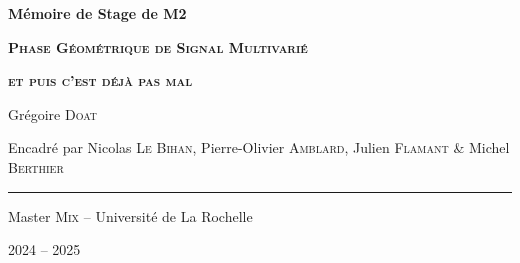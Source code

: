





	
	


\begin{titlepage}
	
	\centering
	\vspace{1.5cm}
	{\huge\textbf{Mémoire de Stage de M2}}\par
	
	\vspace{2cm}
	{\huge\textbf{\textsc{Phase Géométrique de Signal Multivarié}}}\par 
	\vspace{0.5cm}
	
	{\huge\textbf{\textsc{et puis c'est déjà pas mal}}}\par
	\vspace{2.0cm}
	
	{\large Grégoire \textsc{Doat}}\par
	\vspace{0.5cm}
	\vfill
	
	{\large Encadré par Nicolas \textsc{Le Bihan}, Pierre-Olivier \textsc{Amblard}, Julien \textsc{Flamant} \& Michel \textsc{Berthier}}\par
	\vspace{0.5cm}
	
	\rule{10cm}{0.4pt}\par
	\vspace{0.7cm}
	
	{Master \textsc{Mix} -- Université de La Rochelle}\par
	\vspace{0.25cm}
	
	{\large 2024 -- 2025}
\end{titlepage}




